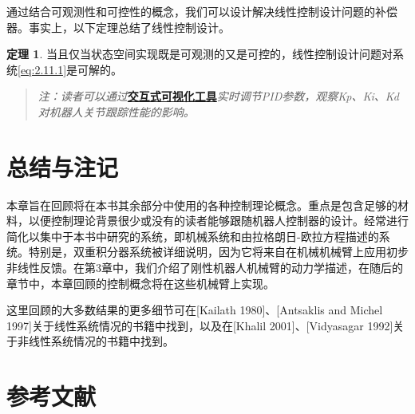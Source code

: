 \documentclass[UTF8,12pt,a4paper]{ctexart}
\theoremstyle{definition}
\newtheorem{theorem}{定理}[section]
\begin{document}
通过结合可观测性和可控性的概念，我们可以设计解决线性控制设计问题的补偿器。事实上，以下定理总结了线性控制设计。

\begin{theorem}
当且仅当状态空间实现既是可观测的又是可控的，线性控制设计问题对系统\eqref{eq:2.11.1}是可解的。
\end{theorem}

\begin{quote}
\textit{注：读者可以通过}\href{https://frankjie09.github.io/Robot-Manipulator-Control-CN/figures/PID_Tuning_Demo.html}{\textbf{交互式可视化工具}}\textit{实时调节PID参数，观察Kp、Ki、Kd对机器人关节跟踪性能的影响。}
\end{quote}

\section{总结与注记}

本章旨在回顾将在本书其余部分中使用的各种控制理论概念。重点是包含足够的材料，以便控制理论背景很少或没有的读者能够跟随机器人控制器的设计。经常进行简化以集中于本书中研究的系统，即机械系统和由拉格朗日-欧拉方程描述的系统。特别是，双重积分器系统被详细说明，因为它将来自在机械机械臂上应用初步非线性反馈。在第3章中，我们介绍了刚性机器人机械臂的动力学描述，在随后的章节中，本章回顾的控制概念将在这些机械臂上实现。

这里回顾的大多数结果的更多细节可在[Kailath 1980]、[Antsaklis and Michel 1997]关于线性系统情况的书籍中找到，以及在[Khalil 2001]、[Vidyasagar 1992]关于非线性系统情况的书籍中找到。

\section*{参考文献}
\end{document}

